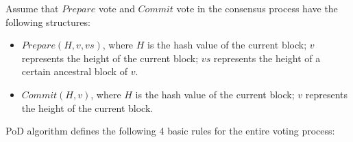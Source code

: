 Assume that $Prepare$ vote and $Commit$ vote in the consensus process have the following structures:


\begin{itemize}
\item $Prepare(H, v, vs)$, where $H$ is the hash value of the current block; $v$ represents the height of the current block; $vs$ represents the height of a certain ancestral block of $v$. 

\item $Commit(H, v)$, where $H$ is the hash value of the current block; $v$ represents the height of the current block.
\end{itemize}

PoD algorithm defines the following 4 basic rules for the entire voting process: 

